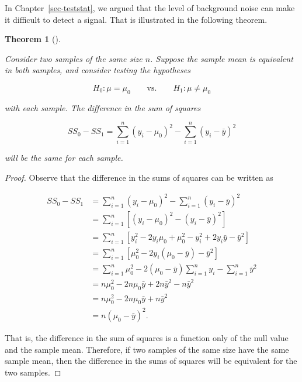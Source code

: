 \documentclass[
  letterpaper,
  DIV=11,
  numbers=noendperiod]{scrreprt}
\theoremstyle{definition}
\theoremstyle{definition}
\theoremstyle{plain}
\newtheorem{theorem}{Theorem}[chapter]
\theoremstyle{remark}
\begin{document}
In Chapter~\ref{sec-teststat}, we argued that the level of background
noise can make it difficult to detect a signal. That is illustrated in
the following theorem.

\begin{theorem}[]\protect\hypertarget{thm-app-teststat-same-signal}{}\label{thm-app-teststat-same-signal}

Consider two samples of the same size \(n\). Suppose the sample mean is
equivalent in both samples, and consider testing the hypotheses

\[H_0: \mu = \mu_0 \qquad \text{vs.} \qquad H_1: \mu \neq \mu_0\]

with each sample. The difference in the sum of squares

\[SS_0 - SS_1 = \sum_{i=1}^{n} \left(y_i - \mu_0\right)^2 - \sum_{i=1}^{n} \left(y_i - \bar{y}\right)^2\]

will be the same for each sample.

\end{theorem}

\begin{proof}
Observe that the difference in the sums of squares can be written as

\[
\begin{aligned}
  SS_0 - SS_1 
    &= \sum_{i=1}^{n} \left(y_i - \mu_0\right)^2 - \sum_{i=1}^{n} \left(y_i - \bar{y}\right)^2 \\
    &= \sum_{i=1}^{n} \left[\left(y_i - \mu_0\right)^2 - \left(y_i - \bar{y}\right)^2\right] \\
    &= \sum_{i=1}^{n} \left[y_i^2 - 2y_i \mu_0 + \mu_0^2 - y_i^2 + 2y_i \bar{y} - \bar{y}^2\right] \\
    &= \sum_{i=1}^{n} \left[\mu_0^2 - 2y_i \left(\mu_0 - \bar{y}\right) - \bar{y}^2\right] \\
    &= \sum_{i=1}^{n} \mu_0^2 - 2\left(\mu_0 - \bar{y}\right)\sum_{i=1}^{n} y_i - \sum_{i=1}^{n} \bar{y}^2 \\
    &= n\mu_0^2 - 2n\mu_0 \bar{y} + 2n\bar{y}^2 - n\bar{y}^2 \\
    &= n\mu_0^2 - 2n\mu_0 \bar{y} + n\bar{y}^2 \\
    &= n \left(\mu_0 - \bar{y}\right)^2.
\end{aligned}
\]

That is, the difference in the sum of squares is a function only of the
null value and the sample mean. Therefore, if two samples of the same
size have the same sample mean, then the difference in the sums of
squares will be equivalent for the two samples.
\end{proof}
\end{document}
